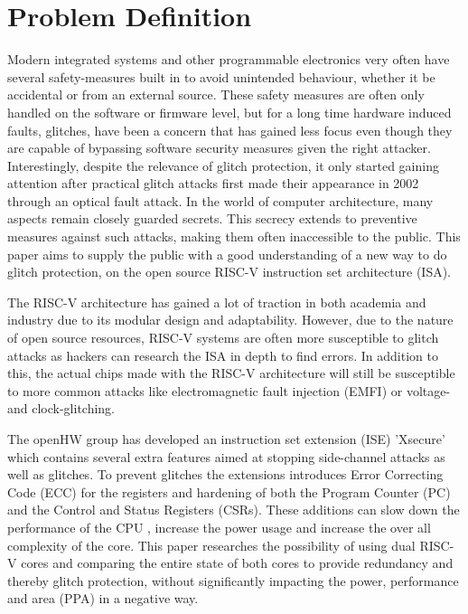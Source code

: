 \chapter{Problem Definition}
\label{chap2}

Modern integrated systems and other programmable electronics very often have several safety-measures built in to avoid unintended behaviour, whether it be accidental or from an external source. These safety measures are often only handled on the software or firmware level, but for a long time hardware induced faults, glitches, have been a concern that has gained less focus even though they are capable of bypassing software security measures given the right attacker. Interestingly, despite the relevance of glitch protection, it only started gaining attention after practical glitch attacks first made their appearance in 2002 through an optical fault attack\cite{trouchkine2019fault}. In the world of computer architecture, many aspects remain closely guarded secrets. This secrecy extends to preventive measures against such attacks, making them often inaccessible to the public. This paper aims to supply the public with a good understanding of a new way to do glitch protection, on the open source RISC-V instruction set architecture (ISA). 

The RISC-V architecture has gained a lot of traction in both academia and industry due to its modular design and adaptability\cite{source2}. However, due to the nature of open source resources, RISC-V systems are often more susceptible to glitch attacks as hackers can research the ISA in depth to find errors\cite{isa_exploit}\cite{trouchkine2019fault}. In addition to this, the actual chips made with the RISC-V architecture will still be susceptible to more common attacks like electromagnetic fault injection (EMFI) or voltage- and clock-glitching. 

The openHW group has developed an instruction set extension (ISE) 'Xsecure' which contains several extra features aimed at stopping side-channel attacks as well as glitches. To prevent glitches the extensions introduces Error Correcting Code (ECC) for the registers and hardening of both the Program Counter (PC) and the Control and Status Registers (CSRs). These additions can slow down the performance of the CPU , increase the power usage and increase the over all complexity of the core. This paper researches the possibility of using dual RISC-V cores and comparing the entire state of both cores to provide redundancy and thereby glitch protection, without significantly impacting the power, performance and area (PPA) in a negative way. 

